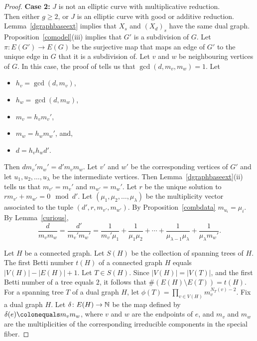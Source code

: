 \begin{proof}
 {\bf{Case 2:}} $J$ is not an elliptic curve with multiplicative reduction. \\
 Then either $g \geq 2$, or $J$ is an elliptic curve with good or additive reduction. Lemma~\ref{dgraphbaseext} implies that $X_s$ and $(X_d)_s$ have the same dual graph. Proposition~\ref{comodel}(iii) implies that $G'$ is a subdivision of $G$. Let $\pi \colon E(G') \rightarrow E(G)$ be the surjective map that maps an edge of $G'$ to the unique edge in $G$ that it is a subdivision of. Let $v$ and $w$ be neighbouring vertices of $G$. In this case, the proof of \cite[Lemma~2.3.2]{halnic} tells us that $\gcd(d,m_v,m_w) = 1$. Let
 \begin{itemize}
  \item $h_v = \gcd(d, m_v)$, 
  \item $h_w = \gcd(d, m_w)$,
  \item $m_v = h_v m_v'$,
  \item $m_w = h_w m_w'$, and,
  \item $d = h_v h_w d'$.
 \end{itemize}
 Then $dm_v' m_w' = d'm_v m_w$. Let $v'$ and $w'$ be the corresponding vertices of $G'$ and let $u_1, u_2, \ldots, u_\lambda$ be the intermediate vertices. Then Lemma~\ref{dgraphbaseext}(ii) tells us that $m_{v'} = m_v'$ and $m_{w'} = m_w'$. Let $r$ be the unique solution to $rm_{v'}+m_{w'} = 0 \mod d'$. Let $(\mu_1,\mu_2, \ldots, \mu_{\lambda})$ be the multiplicity vector associated to the tuple $(d',r,m_{v'},m_{w'})$. By Proposition~\ref{combdata} $m_{u_i} = \mu_i$. By Lemma~\ref{curious},
 \begin{equation}\label{scale}
 \frac{d}{m_v m_w} = \frac{d'}{m_v' m_w'} = \frac{1}{m_v' \mu_1} + \frac{1}{\mu_1 \mu_2} + \cdots + \frac{1}{\mu_{\lambda-1} \mu_\lambda} + \frac{1}{\mu_\lambda m_w'} . 
 \end{equation}
 
 Let $H$ be a connected graph. Let $S(H)$ be the collection of spanning trees of $H$. The first Betti number $t(H)$ of a connected graph $H$ equals $|V(H)|-|E(H)|+1$. Let $T \in S(H)$. Since $|V(H)| = |V(T)|$, and the first Betti number of a tree equals $2$, it follows that $\# (E(H) \setminus E(T)) = t(H)$. For a spanning tree $T$ of a dual graph $H$, let $\phi(T) = \prod_{v \in V(H)} m_v^{N_T(v)-2}$. Fix a dual graph $H$. Let $\delta \colon E(H) \rightarrow \mathbb N$ be the map defined by $\delta(e) \colonequals m_v m_w$, where $v$ and $w$ are the endpoints of $e$, and $m_v$ and $m_w$ are the multiplicities of the corresponding irreducible components in the special fiber. 
 

\end{proof}
